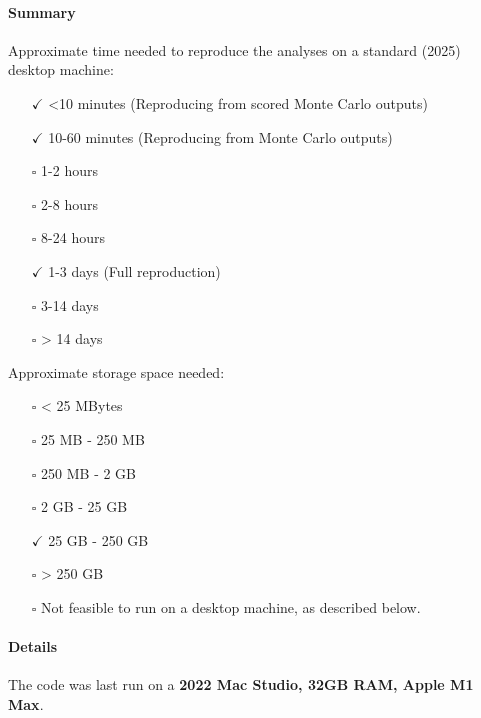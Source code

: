 \documentclass[10pt]{article}
\providecommand{\tightlist}{%
  \setlength{\itemsep}{0pt}\setlength{\parskip}{0pt}}
\begin{document}
\hypertarget{summary}{%
\paragraph{Summary}\label{summary}}

Approximate time needed to reproduce the analyses on a standard (2025) desktop machine:

\begin{itemize}
\tightlist
\item[$\checkmark$]
  \textless10 minutes (Reproducing from scored Monte Carlo outputs)
\item[$\checkmark$]
  10-60 minutes (Reproducing from Monte Carlo outputs)
\item[$\square$]
  1-2 hours
\item[$\square$]
  2-8 hours
\item[$\square$]
  8-24 hours
\item[$\checkmark$]
  1-3 days (Full reproduction)
\item[$\square$]
  3-14 days
\item[$\square$]
  \textgreater{} 14 days
\end{itemize}

Approximate storage space needed:

\begin{itemize}
\item[$\square$]
  \textless{} 25 MBytes
\item[$\square$]
  25 MB - 250 MB
\item[$\square$]
  250 MB - 2 GB
\item[$\square$]
  2 GB - 25 GB
\item[$\checkmark$]
  25 GB - 250 GB
\item[$\square$]
  \textgreater{} 250 GB
\item[$\square$]
  Not feasible to run on a desktop machine, as described below.
\end{itemize}

\hypertarget{details}{%
\paragraph{Details}\label{details}}

The code was last run on a \textbf{2022 Mac Studio, 32GB RAM, Apple M1 Max}.

\end{document}

